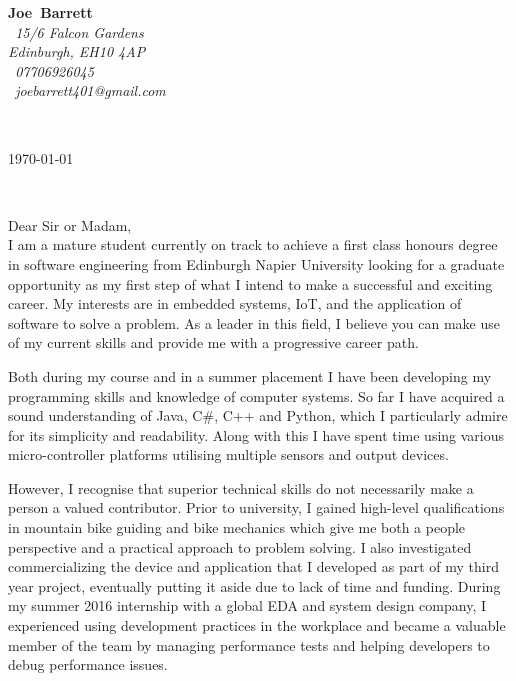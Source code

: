 \documentclass{article}
\makeatletter
\def\firstname{Joe}
\def\surname{Barrett}
\def\address{\faMapMarker~15/6 Falcon Gardens\\Edinburgh, EH10 4AP\\}
\def\phone{\faMobilePhone~07706926045}
\def\email{\faEnvelopeO~joebarrett401@gmail.com}
\def\FileAuthor{\firstname\ \surname}
\def\compName{}
\def\compAddress{}
\makeatother
\begin{document}
	\hfill%
\begin{minipage}[t]{.6\textwidth}
	\raggedleft%
	{\bfseries \FileAuthor}\\[.35ex]
	\small\itshape%
	\address[.35ex]
	\phone\\
	\email

\end{minipage}\\[1em]
%
\begin{minipage}[t]{.4\textwidth}
	\raggedright%
	{\bfseries \compName}
	\small\itshape%
	\compAddress
\end{minipage}
\hfill
\begin{minipage}[t]{.4\textwidth}
	\hfill
	\raggedleft
	\today
\end{minipage}\\[2em]
\raggedright
Dear Sir or Madam,\\[1.5em]
%

I am a mature student currently on track to achieve a first class honours degree in software 
engineering from Edinburgh Napier University looking for a graduate opportunity as my first step of 
what I intend to make a successful and exciting career. My interests are in embedded systems, IoT, 
and the application of software to solve a problem. As a leader in this field, I believe you 
can make use 
of my current skills and 
provide me with a progressive career path.

Both during my course and in a summer placement I have been developing my programming skills and knowledge of computer systems. So far I have acquired a sound understanding of Java, C\#, C++ and Python, which I particularly admire for its simplicity and readability. Along with this I have spent time using various micro-controller platforms utilising multiple sensors and output devices.

However, I recognise that superior technical skills do not necessarily make a person a valued contributor. Prior to university, I gained high-level qualifications in mountain bike guiding and bike mechanics which give me both a people perspective and a practical approach to problem solving. I also investigated commercializing the device and application that I developed as part of my third year project, eventually putting it aside due to lack of time and funding. During my summer 2016 internship with a global EDA and system design company, I experienced using development practices in the workplace and became a valuable member of the team by managing performance tests and helping developers to debug performance issues.
\end{document}
